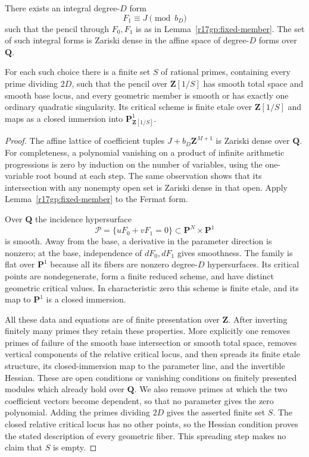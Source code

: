\begin{lemma}
\label{r17gp:integral-pencil}
There exists an integral degree-$D$ form
\[
                              F_1\equiv J\pmod{b_D}
 \tag{GP17.2}\label{r17gp:congruence}
\]
such that the pencil through $F_0,F_1$ is as in
Lemma~\ref{r17gp:fixed-member}. The set of such integral forms
is Zariski dense in the affine space of degree-$D$ forms over
$\mathbf Q$.

For each such choice there is a finite set $S$ of rational
primes, containing every prime dividing $2D$, such that the
pencil over $\mathbf Z[1/S]$ has smooth total space and smooth
base locus, and every geometric member is smooth or has exactly
one ordinary quadratic singularity. Its critical scheme is
finite etale over $\mathbf Z[1/S]$ and maps as a closed immersion
into $\mathbf P^1_{\mathbf Z[1/S]}$.
\end{lemma}

\begin{proof}
The affine lattice of coefficient tuples
$J+b_D\mathbf Z^{M+1}$ is Zariski dense over $\mathbf Q$.
For completeness, a polynomial vanishing on a product of
infinite arithmetic progressions is zero by induction on the
number of variables, using the one-variable root bound at
each step. The same observation shows that its intersection
with any nonempty open set is Zariski dense in that open.
Apply Lemma~\ref{r17gp:fixed-member} to the Fermat form.

Over $\mathbf Q$ the incidence hypersurface
\[
 \mathcal P=\{uF_0+vF_1=0\}
                  \subset\mathbf P^N\times\mathbf P^1
\]
is smooth. Away from the base, a derivative in the parameter
direction is nonzero; at the base, independence of $dF_0,dF_1$
gives smoothness. The family is flat over $\mathbf P^1$ because
all its fibers are nonzero degree-$D$ hypersurfaces. Its critical
points are nondegenerate, form a finite reduced scheme, and have
distinct geometric critical values. In characteristic zero this
scheme is finite etale, and its map to $\mathbf P^1$ is a closed
immersion.

All these data and equations are of finite presentation over
$\mathbf Z$. After inverting finitely many primes they retain
these properties. More explicitly one removes primes of failure
of the smooth base intersection or smooth total space, removes
vertical components of the relative critical locus, and then
spreads its finite etale structure, its closed-immersion map to
the parameter line, and the invertible Hessian. These are open
conditions or vanishing conditions on finitely presented
modules which already hold over $\mathbf Q$. We also remove
primes at which the two coefficient vectors become dependent,
so that no parameter gives the zero polynomial. Adding the primes
dividing $2D$ gives the asserted finite set $S$. The closed
relative critical locus has no other points, so the Hessian
condition proves the stated description of every geometric
fiber. This spreading step makes no claim that $S$ is empty.
\end{proof}

